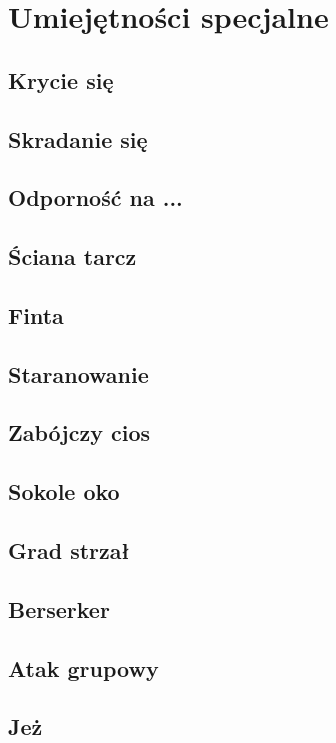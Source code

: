 \chapter{Umiejętności specjalne}

\section{Krycie się}

\section{Skradanie się}

\section{Odporność na ...}

\section{Ściana tarcz}

\section{Finta}

\section{Staranowanie}

\section{Zabójczy cios}

\section{Sokole oko}

\section{Grad strzał}

\section{Berserker}

\section{Atak grupowy}

\section{Jeż}





